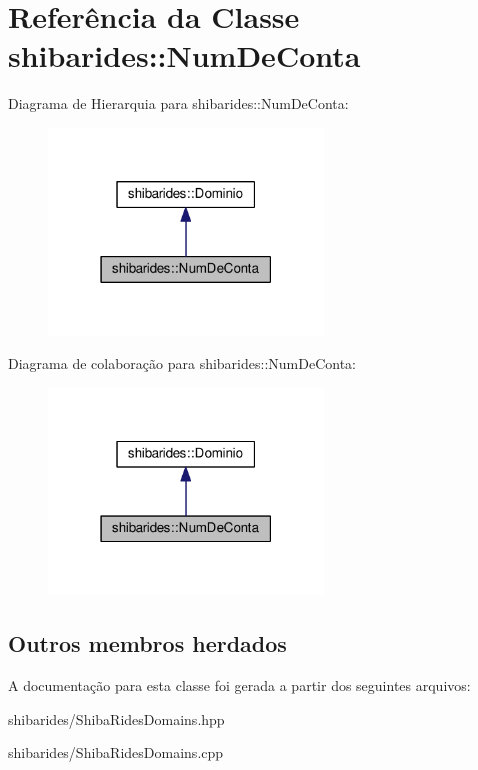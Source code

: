 \hypertarget{classshibarides_1_1NumDeConta}{}\section{Referência da Classe shibarides\+:\+:Num\+De\+Conta}
\label{classshibarides_1_1NumDeConta}


Diagrama de Hierarquia para shibarides\+:\+:Num\+De\+Conta\+:\nopagebreak
\begin{figure}[H]
\begin{center}
\leavevmode
\includegraphics[width=207pt]{classshibarides_1_1NumDeConta__inherit__graph}
\end{center}
\end{figure}


Diagrama de colaboração para shibarides\+:\+:Num\+De\+Conta\+:\nopagebreak
\begin{figure}[H]
\begin{center}
\leavevmode
\includegraphics[width=207pt]{classshibarides_1_1NumDeConta__coll__graph}
\end{center}
\end{figure}
\subsection*{Outros membros herdados}


A documentação para esta classe foi gerada a partir dos seguintes arquivos\+:\begin{DoxyCompactItemize}
\item 
shibarides/Shiba\+Rides\+Domains.\+hpp\item 
shibarides/Shiba\+Rides\+Domains.\+cpp\end{DoxyCompactItemize}
